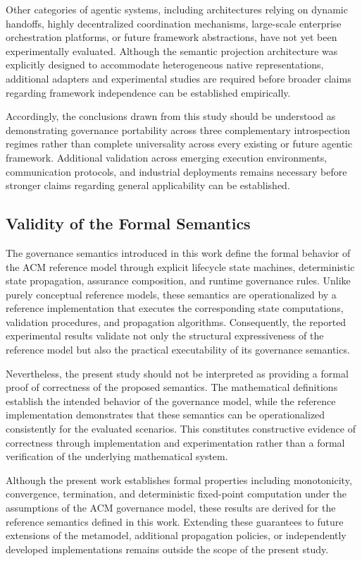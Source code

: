 \documentclass[10pt]{article}
\begin{document}
Other categories of agentic systems, including architectures relying on dynamic handoffs, highly decentralized coordination mechanisms, large-scale enterprise orchestration platforms, or future framework abstractions, have not yet been experimentally evaluated. Although the semantic projection architecture was explicitly designed to accommodate heterogeneous native representations, additional adapters and experimental studies are required before broader claims regarding framework independence can be established empirically.

Accordingly, the conclusions drawn from this study should be understood as demonstrating governance portability across three complementary introspection regimes rather than complete universality across every existing or future agentic framework. Additional validation across emerging execution environments, communication protocols, and industrial deployments remains necessary before stronger claims regarding general applicability can be established.


\subsection{Validity of the Formal Semantics}
\label{sec:validity_formal_semantics}

The governance semantics introduced in this work define the formal behavior of the ACM reference model through explicit lifecycle state machines, deterministic state propagation, assurance composition, and runtime governance rules. Unlike purely conceptual reference models, these semantics are operationalized by a reference implementation that executes the corresponding state computations, validation procedures, and propagation algorithms. Consequently, the reported experimental results validate not only the structural expressiveness of the reference model but also the practical executability of its governance semantics.

Nevertheless, the present study should not be interpreted as providing a formal proof of correctness of the proposed semantics. The mathematical definitions establish the intended behavior of the governance model, while the reference implementation demonstrates that these semantics can be operationalized consistently for the evaluated scenarios. This constitutes constructive evidence of correctness through implementation and experimentation rather than a formal verification of the underlying mathematical system.

Although the present work establishes formal properties including monotonicity, convergence, termination, and deterministic fixed-point computation under the assumptions of the ACM governance model, these results are derived for the reference semantics defined in this work. Extending these guarantees to future extensions of the metamodel, additional propagation policies, or independently developed implementations remains outside the scope of the present study.
\end{document}
